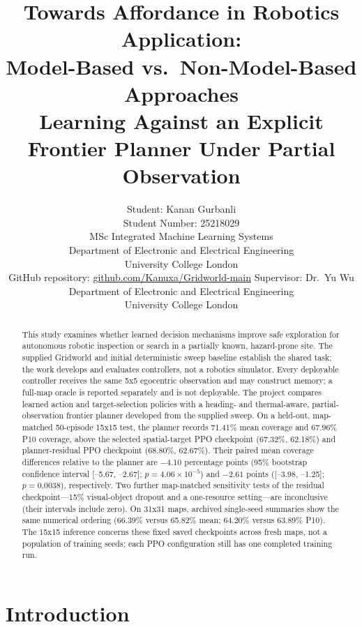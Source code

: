 \documentclass[10pt,letterpaper]{article}
\title{Towards Affordance in Robotics Application:\\[0.35em]
Model-Based vs.\ Non-Model-Based Approaches\\[0.45em]
\large Learning Against an Explicit Frontier Planner Under Partial Observation}
\author{\name Student: Kanan Gurbanli \\
\addr Student Number: 25218029 \\
\addr MSc Integrated Machine Learning Systems \\
\addr Department of Electronic and Electrical Engineering \\
\addr University College London \\
\addr GitHub repository: \href{https://github.com/Kanuxa/Gridworld-main}{github.com/Kanuxa/Gridworld-main}
\AND
\name Supervisor: Dr.\ Yu Wu \\
\addr Department of Electronic and Electrical Engineering \\
\addr University College London
}
\begin{document}
\raggedbottom

\fancyhead[R]{}
\maketitle
\vspace{-0.30in}

\begin{abstract}
This study examines whether learned decision mechanisms improve safe exploration for autonomous robotic inspection or search in a partially known, hazard-prone site. The supplied Gridworld and initial deterministic sweep baseline establish the shared task; the work develops and evaluates controllers, not a robotics simulator. Every deployable controller receives the same 5x5 egocentric observation and may construct memory; a full-map oracle is reported separately and is not deployable. The project compares learned action and target-selection policies with a heading- and thermal-aware, partial-observation frontier planner developed from the supplied sweep. On a held-out, map-matched 50-episode 15x15 test, the planner records 71.41\% mean coverage and 67.96\% P10 coverage, above the selected spatial-target PPO checkpoint (67.32\%, 62.18\%) and planner-residual PPO checkpoint (68.80\%, 62.67\%). Their paired mean coverage differences relative to the planner are $-4.10$ percentage points (95\% bootstrap confidence interval [--5.67, --2.67]; $p=4.06\times10^{-5}$) and $-2.61$ points ([--3.98, --1.25]; $p=0.0038$), respectively. Two further map-matched sensitivity tests of the residual checkpoint---15\% visual-object dropout and a one-resource setting---are inconclusive (their intervals include zero). On 31x31 maps, archived single-seed summaries show the same numerical ordering (66.39\% versus 65.82\% mean; 64.20\% versus 63.89\% P10). The 15x15 inference concerns these fixed saved checkpoints across fresh maps, not a population of training seeds; each PPO configuration still has one completed training run.
\end{abstract}

\section{Introduction}
\end{document}
